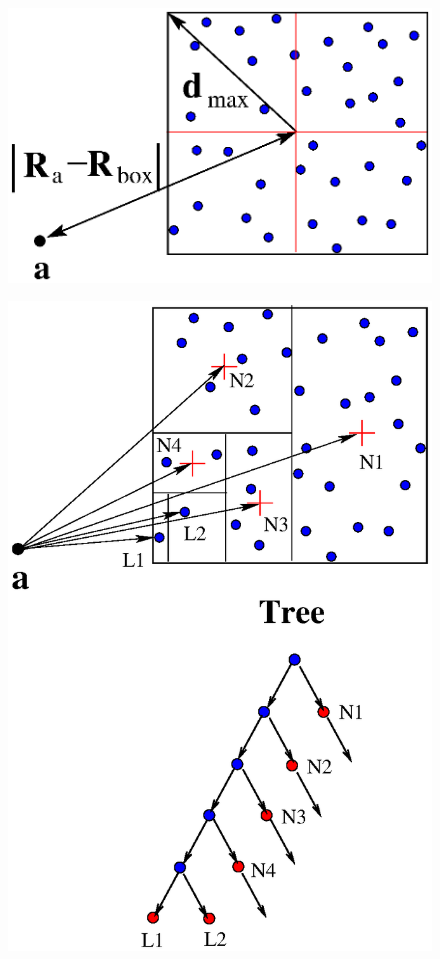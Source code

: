 \documentclass[prb,aps,nobibnotes,superbib,preprint]{revtex4}
\begin{document}
\eject
%
%
%
\begin{figure}
\caption{}
{\centering \includegraphics {MultInBox.ps} \par} 
\label{figure:MultInBox} 
\end{figure}

\begin{figure}
\caption{}
{\centering \includegraphics {TreeInBox.ps} \par} 
\label{figure:TreeInBox} 
\end{figure}
\end{document}
